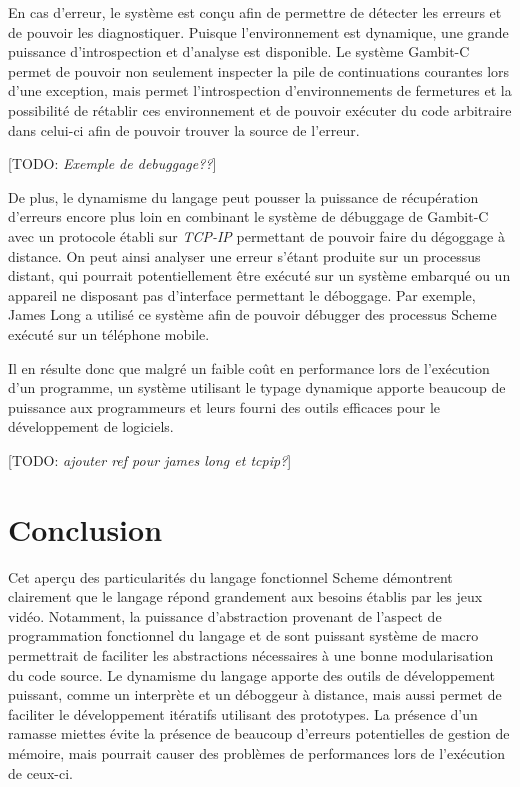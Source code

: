 \documentclass[12pt,oneside,letterpaper,francais]{book}
\newcommand{\todo}[1]{[TODO: {\it #1}]}
\begin{document}
En cas d'erreur, le système est conçu afin de permettre de détecter
les erreurs et de pouvoir les diagnostiquer. Puisque l'environnement
est dynamique, une grande puissance d'introspection et d'analyse est
disponible. Le système Gambit-C permet de pouvoir non seulement
inspecter la pile de continuations courantes lors d'une exception,
mais permet l'introspection d'environnements de fermetures et la
possibilité de rétablir ces environnement et de pouvoir exécuter du
code arbitraire dans celui-ci afin de pouvoir trouver la source de
l'erreur. 

\todo{Exemple de debuggage??}

De plus, le dynamisme du langage peut pousser la puissance de
récupération d'erreurs encore plus loin en combinant le système de
débuggage de Gambit-C avec un protocole établi sur \textit{TCP-IP}
permettant de pouvoir faire du dégoggage à distance. On peut ainsi
analyser une erreur s'étant produite sur un processus distant, qui
pourrait potentiellement être exécuté sur un système embarqué ou un
appareil ne disposant pas d'interface permettant le déboggage. Par
exemple, James Long a utilisé ce système afin de pouvoir débugger des
processus Scheme exécuté sur un téléphone mobile.

Il en résulte donc que malgré un faible coût en performance lors de
l'exécution d'un programme, un système utilisant le typage dynamique
apporte beaucoup de puissance aux programmeurs et leurs fourni des
outils efficaces pour le développement de logiciels.

\todo{ajouter ref pour james long et tcpip?}


\section{Conclusion}

Cet aperçu des particularités du langage fonctionnel Scheme démontrent
clairement que le langage répond grandement aux besoins établis par
les jeux vidéo. Notamment, la puissance d'abstraction provenant de
l'aspect de programmation fonctionnel du langage et de sont puissant
système de macro permettrait de faciliter les abstractions nécessaires
à une bonne modularisation du code source. Le dynamisme du langage
apporte des outils de développement puissant, comme un interprète et
un déboggeur à distance, mais aussi permet de faciliter le
développement itératifs utilisant des prototypes. La présence d'un
ramasse miettes évite la présence de beaucoup d'erreurs potentielles
de gestion de mémoire, mais pourrait causer des problèmes de
performances lors de l'exécution de ceux-ci.
\end{document}
